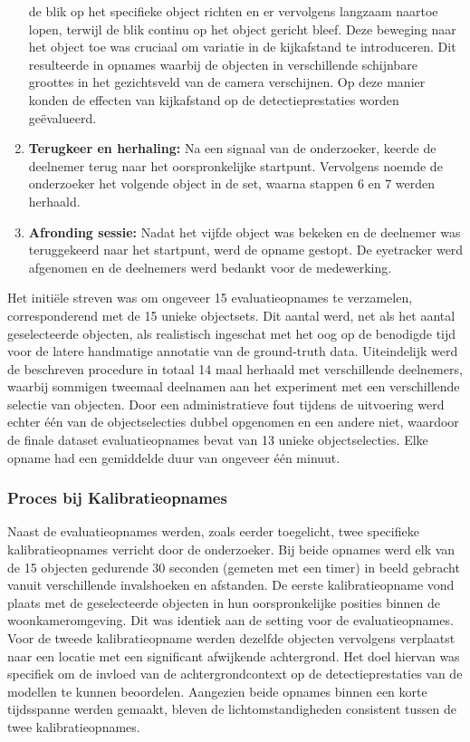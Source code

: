 \begin{enumerate}
  de blik op het specifieke object richten en er vervolgens langzaam naartoe lopen, 
  terwijl de blik continu op het object gericht bleef. 
  Deze beweging naar het object toe was cruciaal om variatie in de kijkafstand te introduceren.
  Dit resulteerde in opnames waarbij de objecten in verschillende schijnbare groottes in het gezichtsveld van de camera verschijnen. 
  Op deze manier konden de effecten van kijkafstand op de detectieprestaties worden geëvalueerd.
  \item \textbf{Terugkeer en herhaling:} Na een signaal van de onderzoeker, keerde de deelnemer terug naar het oorspronkelijke startpunt. 
  Vervolgens noemde de onderzoeker het volgende object in de set, waarna stappen 6 en 7 werden herhaald.
  \item \textbf{Afronding sessie:} Nadat het vijfde object was bekeken en de deelnemer was teruggekeerd naar het startpunt, 
  werd de opname gestopt. De eyetracker werd afgenomen en de deelnemers werd bedankt voor de medewerking.
\end{enumerate}

Het initiële streven was om ongeveer 15 evaluatieopnames te verzamelen, corresponderend met de 15 unieke objectsets. 
Dit aantal werd, net als het aantal geselecteerde objecten, als realistisch ingeschat met het oog op de benodigde tijd voor de 
latere handmatige annotatie van de ground-truth data. 
Uiteindelijk werd de beschreven procedure in totaal 14 maal herhaald met verschillende deelnemers, 
waarbij sommigen tweemaal deelnamen aan het experiment met een verschillende selectie van objecten. 
Door een administratieve fout tijdens de uitvoering werd echter één van de objectselecties dubbel opgenomen en een andere niet, 
waardoor de finale dataset evaluatieopnames bevat van 13 unieke objectselecties. 
Elke opname had een gemiddelde duur van ongeveer één minuut.

\subsubsection{Proces bij Kalibratieopnames}
\label{sec:kalibratieopnames}

Naast de evaluatieopnames werden, zoals eerder toegelicht, twee specifieke kalibratieopnames verricht door de onderzoeker.
Bij beide opnames werd elk van de 15 objecten gedurende 30 seconden (gemeten met een timer) in beeld gebracht vanuit verschillende invalshoeken en afstanden.
De eerste kalibratieopname vond plaats met de geselecteerde objecten in hun oorspronkelijke posities binnen de woonkameromgeving.
Dit was identiek aan de setting voor de evaluatieopnames. 
Voor de tweede kalibratieopname werden dezelfde objecten vervolgens verplaatst naar een locatie met een significant afwijkende achtergrond. 
Het doel hiervan was specifiek om de invloed van de achtergrondcontext op de detectieprestaties van de modellen te kunnen beoordelen.
Aangezien beide opnames binnen een korte tijdsspanne werden gemaakt, bleven de lichtomstandigheden consistent tussen de twee kalibratieopnames.